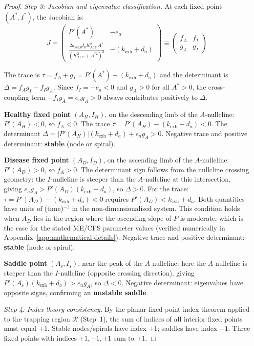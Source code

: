 \begin{proof}
\emph{Step 3: Jacobian and eigenvalue classification.} At each fixed point $(A^*, I^*)$, the Jacobian is:
\begin{equation}
\label{eq:jacobian-2d}
J = \begin{pmatrix} P'(A^*) & -e_a \\ \displaystyle\frac{2 k_{\text{act,0}} I_0 K_{\text{ATP}}^2 A^*}{(K_{\text{ATP}}^2 + A^{*2})^2} & -(k_{\text{exh}} + d_a) \end{pmatrix} \equiv \begin{pmatrix} f_A & f_I \\ g_A & g_I \end{pmatrix}
\end{equation}

The trace is $\tau = f_A + g_I = P'(A^*) - (k_{\text{exh}} + d_a)$ and the determinant is $\Delta = f_A g_I - f_I g_A$. Since $f_I = -e_a < 0$ and $g_A > 0$ for all $A^* > 0$, the cross-coupling term $-f_I g_A = e_a g_A > 0$ always contributes positively to $\Delta$.

\textbf{Healthy fixed point} $(A_H, I_H)$, on the descending limb of the $A$-nullcline: $P'(A_H) < 0$, so $f_A < 0$. The trace $\tau = P'(A_H) - (k_{\text{exh}} + d_a) < 0$. The determinant $\Delta = |P'(A_H)|(k_{\text{exh}} + d_a) + e_a g_A > 0$. Negative trace and positive determinant: \textbf{stable} (node or spiral).

\textbf{Disease fixed point} $(A_D, I_D)$, on the ascending limb of the $A$-nullcline: $P'(A_D) > 0$, so $f_A > 0$. The determinant sign follows from the nullcline crossing geometry: the $I$-nullcline is steeper than the $A$-nullcline at this intersection, giving $e_a g_A > P'(A_D)(k_{\text{exh}} + d_a)$, so $\Delta > 0$. For the trace: $\tau = P'(A_D) - (k_{\text{exh}} + d_a) < 0$ requires $P'(A_D) < k_{\text{exh}} + d_a$. Both quantities have units of (time)$^{-1}$ in the non-dimensionalised system. This condition holds when $A_D$ lies in the region where the ascending slope of $P$ is moderate, which is the case for the stated ME/CFS parameter values (verified numerically in Appendix~\ref{app:mathematical-details}). Negative trace and positive determinant: \textbf{stable} (node or spiral).

\textbf{Saddle point} $(A_s, I_s)$, near the peak of the $A$-nullcline: here the $A$-nullcline is steeper than the $I$-nullcline (opposite crossing direction), giving $P'(A_s)(k_{\text{exh}} + d_a) > e_a g_A$, so $\Delta < 0$. Negative determinant: eigenvalues have opposite signs, confirming an \textbf{unstable saddle}.

\emph{Step 4: Index theory consistency.} By the planar fixed-point index theorem applied to the trapping region $\mathcal{R}$ (Step~1), the sum of indices of all interior fixed points must equal $+1$. Stable nodes/spirals have index $+1$; saddles have index $-1$. Three fixed points with indices $+1, -1, +1$ sum to $+1$. \checkmark
\end{proof}

